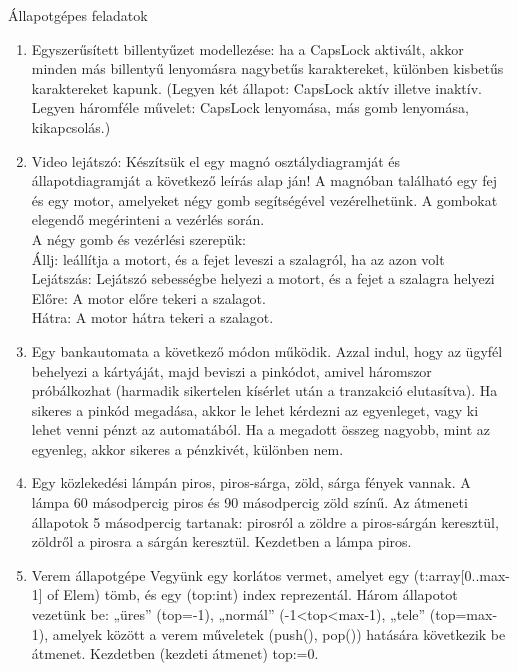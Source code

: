 \documentclass[12pt,a4paper]{article}
\begin{document}
Állapotgépes feladatok

\begin{enumerate}
\item Egyszerűsített billentyűzet modellezése: ha a CapsLock aktivált, akkor minden más billentyű lenyomásra nagybetűs karaktereket, különben kisbetűs karaktereket kapunk. (Legyen két állapot: CapsLock aktív illetve inaktív. Legyen háromféle művelet: CapsLock lenyomása, más gomb lenyomása, kikapcsolás.)
\item Video lejátszó: Készítsük el egy magnó osztálydiagramját és állapotdiagramját a következő
leírás alap ján! A magnóban található egy fej és egy motor, amelyeket négy
gomb segítségével vezérelhetünk. A gombokat elegendő megérinteni a vezérlés
során. \\ 
A négy gomb és vezérlési szerepük: \\
Állj: leállítja a motort, és a fejet leveszi a szalagról, ha az azon volt \\
Lejátszás: Lejátszó sebességbe helyezi a motort, és a fejet a szalagra
helyezi \\
Előre: A motor előre tekeri a szalagot. \\
Hátra: A motor hátra tekeri a szalagot. \\

\item Egy bankautomata a következő módon működik. Azzal indul, hogy az ügyfél behelyezi a kártyáját, majd beviszi a pinkódot, amivel háromszor próbálkozhat (harmadik sikertelen kísérlet után a tranzakció elutasítva). Ha sikeres a pinkód megadása, akkor le lehet kérdezni az egyenleget, vagy ki lehet venni pénzt az automatából. Ha a megadott összeg nagyobb, mint az egyenleg, akkor sikeres a pénzkivét, különben nem.

\item Egy közlekedési lámpán piros, piros-sárga, zöld, sárga fények vannak. A lámpa 60 másodpercig piros és 90 másodpercig zöld színű. Az átmeneti állapotok 5 másodpercig tartanak: pirosról a zöldre a piros-sárgán keresztül, zöldről a pirosra a sárgán keresztül. Kezdetben a lámpa piros.


\item Verem állapotgépe 
Vegyünk egy korlátos vermet, amelyet egy (t:array[0..max-1] of Elem) tömb, és egy (top:int) index reprezentál.  Három állapotot vezetünk be: „üres” (top=-1), „normál” (-1<top<max-1), „tele” (top=max-1), amelyek között a verem műveletek (push(), pop()) hatására következik be átmenet. Kezdetben (kezdeti átmenet) top:=0. 

\end{enumerate}
\end{document}

